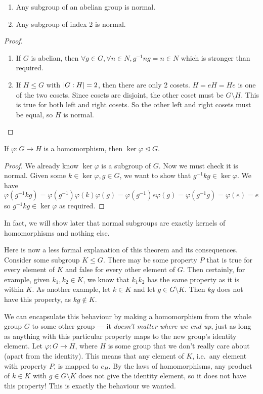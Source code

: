 \begin{proposition}
	\begin{enumerate}
		\item Any subgroup of an abelian group is normal.
		\item Any subgroup of index 2 is normal.
	\end{enumerate}
\end{proposition}
\begin{proof}
	\begin{enumerate}
		\item If \(G\) is abelian, then \(\forall g \in G, \forall n \in N, g^{-1}ng = n \in N\) which is stronger than required.
		\item If \(H \leq G\) with \(\abs{G : H} = 2\), then there are only 2 cosets.
		      \(H = eH = He\) is one of the two cosets.
		      Since cosets are disjoint, the other coset must be \(G \setminus H\).
		      This is true for both left and right cosets.
		      So the other left and right cosets must be equal, so \(H\) is normal.
	\end{enumerate}
\end{proof}

\begin{proposition}
	If \(\varphi: G \to H\) is a homomorphism, then \(\ker \varphi \trianglelefteq G\).
\end{proposition}
\begin{proof}
	We already know \(\ker \varphi\) is a subgroup of \(G\).
	Now we must check it is normal.
	Given some \(k \in \ker \varphi, g \in G\), we want to show that \(g^{-1} k g \in \ker \varphi\).
	We have \(\varphi(g^{-1} k g) = \varphi(g^{-1}) \varphi(k) \varphi(g) = \varphi(g^{-1}) e \varphi(g) = \varphi(g^{-1}g) = \varphi(e) = e\) so \(g^{-1} k g \in \ker \varphi\) as required.
\end{proof}
In fact, we will show later that normal subgroups are exactly kernels of homomorphisms and nothing else.

Here is now a less formal explanation of this theorem and its consequences.
Consider some subgroup \(K \leq G\).
There may be some property \(P\) that is true for every element of \(K\) and false for every other element of \(G\).
Then certainly, for example, given \(k_1, k_2 \in K\), we know that \(k_1k_2\) has the same property as it is within \(K\).
As another example, let \(k \in K\) and let \(g \in G \setminus K\).
Then \(kg\) does not have this property, as \(kg \notin K\).

We can encapsulate this behaviour by making a homomorphism from the whole group \(G\) to some other group --- it \textit{doesn't matter where we end up}, just as long as anything with this particular property maps to the new group's identity element.
Let \(\varphi: G \to H\), where \(H\) is some group that we don't really care about (apart from the identity).
This means that any element of \(K\), i.e.\ any element with property \(P\), is mapped to \(e_H\).
By the laws of homomorphisms, any product of \(k \in K\) with \(g \in G \setminus K\) does not give the identity element, so it does not have this property!
This is exactly the behaviour we wanted.

